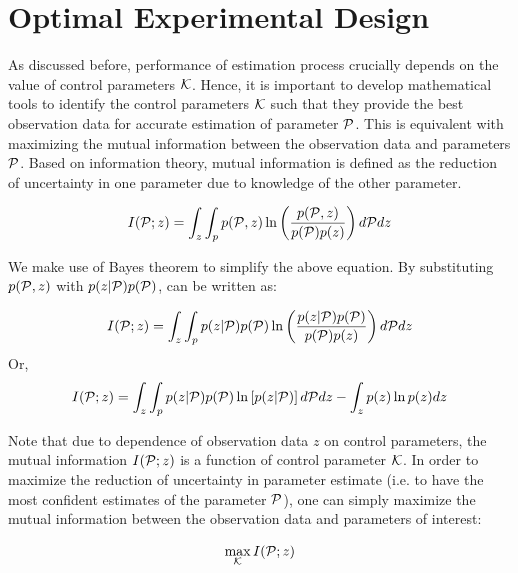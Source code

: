 \documentclass[]{article}
\begin{document}


\section*{Optimal Experimental Design}\label{oed}
As discussed before, performance of estimation process crucially depends on the value of control parameters $\mathcal{K}$. Hence, it is important to develop mathematical tools to identify the control parameters $\mathcal{K}$ such that they provide the best observation data for accurate estimation of parameter $\mathcal{P}$. This is equivalent with maximizing the mutual information between the observation data and parameters $\mathcal{P}$. Based on information theory, mutual information is defined as the reduction of uncertainty in one parameter due to knowledge of the other parameter.

\begin{equation} \label{mi}
I(\mathcal{P};z)=\int_z\int_p p(\mathcal{P},z)\ln\left(\frac{p(\mathcal{P},z)}{p(\mathcal{P})p(z)}\right)d\mathcal{P} dz
\end{equation}

We make use of Bayes theorem to simplify the above equation. By substituting $p(\mathcal{P},z)$ with $p(z|\mathcal{P})p(\mathcal{P})$,  can be written as:

\begin{equation} \label{mi2}
I(\mathcal{P};z)=\int_z\int_p p(z|\mathcal{P})p(\mathcal{P})\ln\left(\frac{p(z|\mathcal{P})p(\mathcal{P})}{p(\mathcal{P})p(z)}\right)d\mathcal{P} dz
\end{equation}
Or,
\begin{equation} \label{mi3}
I(\mathcal{P};z)=\int_z\int_p p(z|\mathcal{P})p(\mathcal{P})\ln\left[p(z|\mathcal{P})\right]d\mathcal{P} dz - \int_z p(z) \ln p(z)dz
\end{equation}



Note that due to dependence of observation data $z$ on control parameters, the mutual information $I(\mathcal{P};z)$ is a function of control parameter $\mathcal{K}$. In order to maximize the reduction of uncertainty in parameter estimate (i.e. to have the most confident estimates of the parameter $\mathcal{P}$), one can simply maximize the mutual information between the observation data and parameters of interest:

\begin{equation}\label{mimax}
\max_{\mathcal{K}} I(\mathcal{P};z)
\end{equation}
\end{document}
